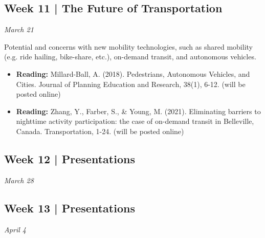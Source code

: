 \documentclass[11pt]{article}
\begin{document}
	
	
	
		
	\subsection*{Week 11 | The Future of Transportation}
	
	\textit{March 21}
	
	Potential and concerns with new mobility technologies, such as shared mobility (e.g. ride hailing, bike-share, etc.), on-demand transit, and autonomous vehicles.
	
	\begin{itemize}
		\item \textbf{Reading:} Millard-Ball, A. (2018). Pedestrians, Autonomous Vehicles, and Cities. Journal of
		Planning Education and Research, 38(1), 6-12. (will be posted online)
		
		\item \textbf{Reading:} Zhang, Y., Farber, S., \& Young, M. (2021). Eliminating barriers to nighttime activity participation: the case of on-demand transit in Belleville, Canada. Transportation, 1-24. (will be posted online)
	\end{itemize}
	
	
	
	
	
	
	\subsection*{Week 12 | Presentations}
	
	\textit{March 28}
	
	
	\subsection*{Week 13 | Presentations}

	\textit{April 4}

	
	


	
\end{document}
